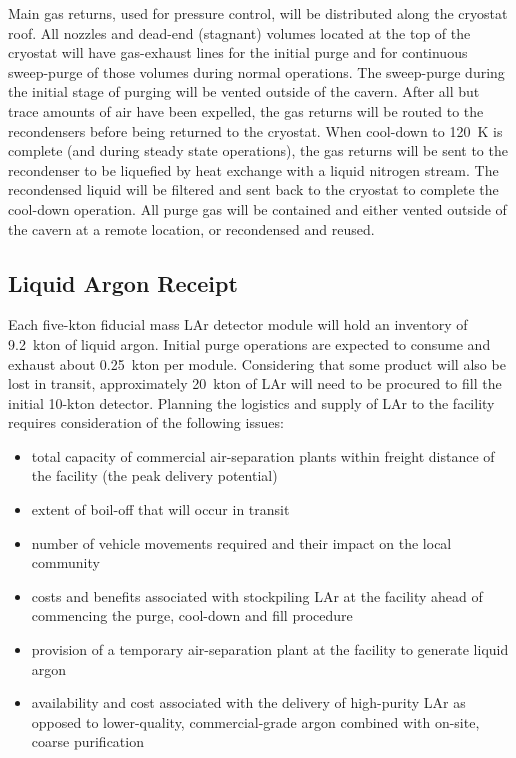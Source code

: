 Main gas returns, used for pressure control, will be distributed along the cryostat roof.  All nozzles and dead-end (stagnant) volumes located at the top of the cryostat will have gas-exhaust lines for the initial purge and for continuous sweep-purge of those volumes during normal operations.  
The sweep-purge during the initial stage of purging will be vented outside of the cavern.  After all but trace amounts of air have been expelled, the gas returns will be routed to the recondensers before being returned to the cryostat.  When cool-down to 120~K is complete (and during steady state operations), the gas returns will be sent to the recondenser to be liquefied by heat exchange with a liquid nitrogen stream.  The recondensed liquid will be filtered and sent back to the cryostat to complete the cool-down operation.
All purge gas will be contained and either vented outside of the cavern at a remote location, or recondensed and reused. 

\subsection{Liquid Argon Receipt}

Each five-kton fiducial mass LAr detector module will hold an inventory of 9.2~kton of liquid argon.  Initial purge operations are expected to consume and exhaust about 0.25~kton per module.  Considering that some product will also be lost in transit, approximately 20~kton of LAr will need to be procured to fill the initial 10-kton detector.  Planning the logistics and supply of LAr to the facility requires consideration of the following issues:

\begin{itemize}
\item  total capacity of commercial air-separation plants within freight distance of the facility (the peak delivery potential)
\item extent of boil-off that will occur in transit
\item  number of vehicle movements required and their impact on the local community
\item costs and benefits associated with stockpiling LAr at the facility ahead of commencing the purge, cool-down and fill procedure
\item provision of a temporary air-separation plant at the facility to generate liquid argon
\item  availability and cost associated with the delivery of high-purity LAr as opposed to lower-quality, commercial-grade argon combined with on-site, coarse purification
\end{itemize}

